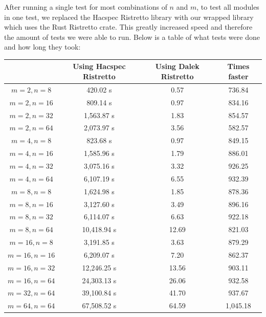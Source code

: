 \documentclass{article}
\begin{document}
After running a single test for most combinations of $n$ and $m$, to
test all modules in one test, we replaced the Hacspec Ristretto library
with our wrapped library which uses the Rust Ristretto crate. This
greatly increased speed and therefore the amount of tests we were able
to run. Below is a table of what tests were done and how long they took:

\begin{center}
\begin{tabular}{ c|c|c|c } 
	& Using Hacspec Ristretto & Using Dalek Ristretto & Times faster\\ \hline\hline
	$m = 2, n = 8 $    & 420.02 s     & 0.57  & 736.84 \\ \hline 
	$m = 2, n = 16 $   & 809.14 s     & 0.97  & 834.16 \\ \hline 
	$m = 2, n = 32 $   & 1,563.87 s   & 1.83  & 854.57 \\ \hline 
	$m = 2, n = 64 $   & 2,073.97 s   & 3.56  & 582.57 \\ \hline 
	\hline\hline
	$m = 4, n = 8$    & 823.68 s     & 0.97  & 849.15 \\ \hline 
	$m = 4, n = 16$   & 1,585.96 s   & 1.79  & 886.01 \\ \hline 
	$m = 4, n = 32$   & 3,075.16 s   & 3.32  & 926.25 \\ \hline 
	$m = 4, n = 64$   & 6,107.19 s   & 6.55  & 932.39 \\ \hline 
	\hline\hline
	$m = 8, n = 8$    & 1,624.98 s   & 1.85  & 878.36 \\ \hline 
	$m = 8, n = 16$   & 3,127.60 s   & 3.49  & 896.16 \\ \hline 
	$m = 8, n = 32$   & 6,114.07 s   & 6.63  & 922.18 \\ \hline 
	$m = 8, n = 64$   & 10,418.94 s  & 12.69 & 821.03 \\ \hline 
	\hline\hline
	$m = 16, n = 8$   & 3,191.85 s   & 3.63  & 879.29 \\ \hline 
	$m = 16, n = 16$  & 6,209.07 s   & 7.20  & 862.37 \\ \hline 
	$m = 16, n = 32$  & 12,246.25 s  & 13.56 & 903.11 \\ \hline 
	$m = 16, n = 64$  & 24,303.13 s  & 26.06 & 932.58 \\ \hline 
	\hline\hline
	$m = 32, n = 64$  & 39,100.84 s  & 41.70 & 937.67 \\ \hline 
	\hline\hline
	$m = 64, n = 64$  & 67,508.52 s  & 64.59 & 1,045.18 \\ \hline 
\end{tabular}
\end{center}
\end{document}
